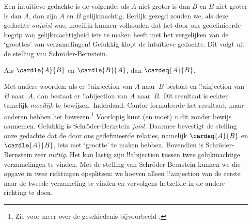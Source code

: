 \documentclass[../../../include/open-logic-section]{subfiles}
\begin{document}
\begin{explain}
Een intuïtieve gedachte is de volgende: als $A$ niet groter is dan $B$
en $B$ niet groter is dan $A$, dan zijn $A$ en $B$ gelijkmachtig.
Eerlijk gezegd zouden we, als deze gedachte \emph{onjuist} was,
moeilijk kunnen volhouden dat het door ons gedefinieerde begrip van
gelijkmachtigheid iets te maken heeft met het vergelijken van de
‘groottes’ van verzamelingen!{} Gelukkig klopt de intuïtieve gedachte.
Dit volgt uit de stelling van Schr\"oder-Bernstein.
\end{explain}
\begin{thm}
	Als $\cardle{A}{B}$ en $\cardle{B}{A}$,
	dan $\cardeq{A}{B}$.
\end{thm}
\begin{explain}
Met andere woorden: als er !!a{injection} van $A$ naar~$B$ bestaat en
!!a{injection} van $B$ naar~$A$, dan bestaat er !!a{bijection} van $A$
naar~$B$.
Dit resultaat is echter tamelijk \emph{moeilijk} te bewijzen. Inderdaad:
Cantor formuleerde het resultaat, maar anderen hebben het
bewezen.\footnote{Zie voor meer over de geschiedenis bijvoorbeeld
\citet[pp.~165--6]{Potter2004}.}
%
Voorlopig kunt (en moet) u dit zonder bewijs aannemen.
Gelukkig is Schr\"oder-Bernstein \emph{juist}. Daarmee bevestigt de
stelling onze gedachte dat de door ons gedefinieerde relaties, namelijk
$\cardeq{A}{B}$ en $\cardle{A}{B}$, iets met ‘grootte’ te maken hebben.
Bovendien is Schr\"oder-Bernstein zeer \emph{nuttig}. Het kan lastig
zijn !!a{bijection} tussen twee gelijkmachtige verzamelingen te
vinden. Met de stelling van Schr\"oder-Bernstein kunnen we die opgave in
twee richtingen opsplitsen: we hoeven alleen !!a{injection} van de eerste
naar de tweede verzameling te vinden en vervolgens hetzelfde in de
andere richting te doen.
\end{explain}
\end{document}
